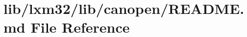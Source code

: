 \hypertarget{lib_2lxm32_2lib_2canopen_2_r_e_a_d_m_e_8md}{}\section{lib/lxm32/lib/canopen/\+R\+E\+A\+D\+ME.md File Reference}
\label{lib_2lxm32_2lib_2canopen_2_r_e_a_d_m_e_8md}
